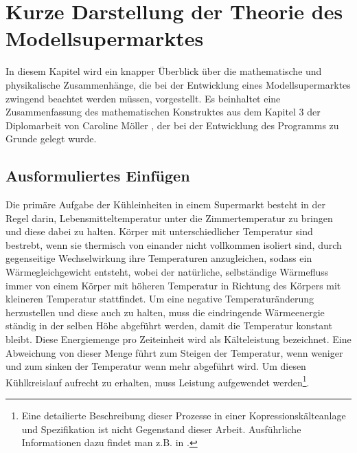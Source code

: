 \chapter{Kurze Darstellung der Theorie des Modellsupermarktes}
\label{chap:theorie}
\minitoc
In diesem Kapitel wird ein knapper Überblick über die mathematische und physikalische Zusammenhänge, die bei der Entwicklung eines
Modellsupermarktes zwingend beachtet werden müssen, vorgestellt. Es beinhaltet eine
Zusammenfassung des mathematischen Konstruktes aus dem Kapitel 3 der Diplomarbeit von Caroline Möller \cite{caro}, der bei der
Entwicklung des Programms zu Grunde gelegt wurde.

\section{Ausformuliertes Einfügen}

Die primäre Aufgabe der Kühleinheiten in einem Supermarkt besteht in der Regel darin, Lebensmitteltemperatur unter die
Zimmertemperatur zu bringen und diese dabei zu halten. Körper mit unterschiedlicher Temperatur sind bestrebt, wenn sie
thermisch von einander nicht vollkommen isoliert sind, durch gegenseitige Wechselwirkung ihre Temperaturen anzugleichen,
sodass ein Wärmegleichgewicht entsteht, wobei der natürliche, selbständige Wärmefluss immer von einem Körper mit höheren
Temperatur in Richtung des Körpers mit kleineren Temperatur stattfindet. Um eine negative Temperaturänderung herzustellen und
diese auch zu halten, muss die eindringende Wärmeenergie ständig in der selben Höhe abgeführt werden, damit die Temperatur
konstant bleibt. Diese Energiemenge pro Zeiteinheit wird als Kälteleistung bezeichnet. Eine Abweichung von dieser Menge führt
zum Steigen der Temperatur, wenn weniger und zum sinken der Temperatur wenn mehr abgeführt wird. Um diesen Kühlkreislauf
aufrecht zu erhalten, muss Leistung aufgewendet werden\footnote{ Eine detailierte Beschreibung dieser Prozesse in einer
Kopressionskälteanlage und Spezifikation ist nicht Gegenstand dieser Arbeit. Ausführliche Informationen dazu findet man z.B.
in \cite{caro, doctor, TAB_A1}.}.


